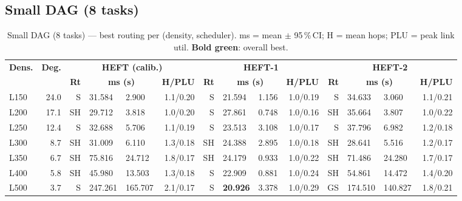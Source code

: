 \documentclass[11pt]{article}
\newcommand{\win}[1]{\textcolor{green!50!black}{\textbf{#1}}}
\begin{document}
\subsection{Small DAG (8 tasks)}
\begin{table}[H]\centering\small
\begin{tabular}{l r r@{\,}l@{$\pm$}l@{\,}r r@{\,}l@{$\pm$}l@{\,}r r@{\,}l@{$\pm$}l@{\,}r}
\toprule
\textbf{Dens.} & \textbf{Deg.} & \multicolumn{4}{c}{\textbf{HEFT (calib.)}} & \multicolumn{4}{c}{\textbf{HEFT-1}} & \multicolumn{4}{c}{\textbf{HEFT-2}} \\
\cmidrule(lr){3-6}\cmidrule(lr){7-10}\cmidrule(lr){11-14}
& & \textbf{Rt} & \multicolumn{2}{c}{\textbf{ms (s)}} & \textbf{H/PLU} & \textbf{Rt} & \multicolumn{2}{c}{\textbf{ms (s)}} & \textbf{H/PLU} & \textbf{Rt} & \multicolumn{2}{c}{\textbf{ms (s)}} & \textbf{H/PLU} \\
\midrule
  L150 & 24.0 & S & 31.584 & 2.900 & 1.1/0.20 & S & 21.594 & 1.156 & 1.0/0.19 & S & 34.633 & 3.060 & 1.1/0.21 \\
  L200 & 17.1 & SH & 29.712 & 3.818 & 1.0/0.20 & S & 27.861 & 0.748 & 1.0/0.16 & SH & 35.664 & 3.807 & 1.0/0.22 \\
  L250 & 12.4 & S & 32.688 & 5.706 & 1.1/0.19 & S & 23.513 & 3.108 & 1.0/0.17 & S & 37.796 & 6.982 & 1.2/0.18 \\
  L300 & 8.7 & SH & 31.009 & 6.110 & 1.3/0.18 & SH & 24.388 & 2.895 & 1.0/0.18 & SH & 28.641 & 5.516 & 1.2/0.17 \\
  L350 & 6.7 & SH & 75.816 & 24.712 & 1.8/0.17 & SH & 24.179 & 0.933 & 1.0/0.22 & SH & 71.486 & 24.280 & 1.7/0.17 \\
  L400 & 5.8 & SH & 45.980 & 13.503 & 1.3/0.18 & S & 22.909 & 0.881 & 1.0/0.24 & SH & 54.861 & 14.472 & 1.4/0.20 \\
  L500 & 3.7 & S & 247.261 & 165.707 & 2.1/0.17 & S & \win{20.926} & 3.378 & 1.0/0.29 & GS & 174.510 & 140.827 & 1.8/0.21 \\
\bottomrule\end{tabular}
\caption{Small DAG (8 tasks) --- best routing per (density, scheduler). ms = mean $\pm$ 95\,\%\,CI; H = mean hops; PLU = peak link util. \win{Bold green}: overall best.}
\end{table}
\end{document}
